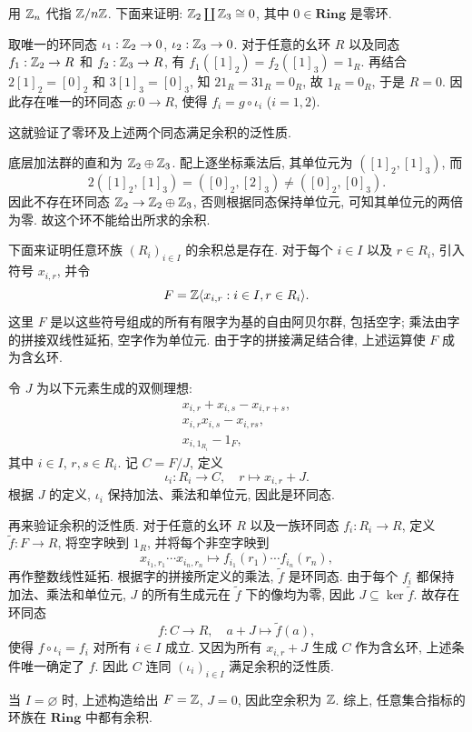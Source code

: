 \documentclass{article}
\begin{document}
\begin{solution}
	用 $\mathbb{Z}_n$ 代指 $\mathbb{Z} / n\mathbb{Z}$. 下面来证明: $\mathbb{Z}_2 \coprod \mathbb{Z}_3 \cong 0$, 其中 $0 \in \mathbf{Ring}$ 是零环. 

	取唯一的环同态 $\iota_1: \mathbb{Z}_2 \to 0$, $\iota_2: \mathbb{Z}_3 \to 0$. 对于任意的幺环 $R$ 以及同态 $f_1: \mathbb{Z}_2 \to R$ 和 $f_2: \mathbb{Z}_3 \to R$, 有 $f_1([1]_2) = f_2([1]_3) = 1_R$. 再结合 $2[1]_2 = [0]_2$ 和 $3[1]_3 = [0]_3$, 知 $2 1_R = 3 1_R = 0_R$, 故 $1_R = 0_R$, 于是 $R = 0$. 因此存在唯一的环同态 $g: 0 \to R$, 使得 $f_i = g \circ \iota_i$ ($i = 1, 2$). 

	这就验证了零环及上述两个同态满足余积的泛性质.

	底层加法群的直和为 $\mathbb{Z}_2 \oplus \mathbb{Z}_3$. 配上逐坐标乘法后, 其单位元为 $([1]_2, [1]_3)$, 而
	\[ 2([1]_2, [1]_3) = ([0]_2, [2]_3) \neq ([0]_2, [0]_3). \]
	因此不存在环同态 $\mathbb{Z}_2 \to \mathbb{Z}_2 \oplus \mathbb{Z}_3$, 否则根据同态保持单位元, 可知其单位元的两倍为零. 故这个环不能给出所求的余积.

	下面来证明任意环族 $(R_i)_{i \in I}$ 的余积总是存在. 对于每个 $i \in I$ 以及 $r \in R_i$, 引入符号 $x_{i,r}$, 并令
	\[ F = \mathbb{Z}\langle x_{i,r}: i \in I, r \in R_i \rangle. \]
	这里 $F$ 是以这些符号组成的所有有限字为基的自由阿贝尔群, 包括空字; 乘法由字的拼接双线性延拓, 空字作为单位元. 由于字的拼接满足结合律, 上述运算使 $F$ 成为含幺环.

	令 $J$ 为以下元素生成的双侧理想:
	\begin{gather*}
		x_{i,r} + x_{i,s} - x_{i,r+s},\\
		x_{i,r}x_{i,s} - x_{i,rs},\\
		x_{i,1_{R_i}} - 1_F,
	\end{gather*}
	其中 $i \in I$, $r, s \in R_i$. 记 $C = F/J$, 定义
	\[ \iota_i: R_i \to C, \quad r \mapsto x_{i,r} + J. \]
	根据 $J$ 的定义, $\iota_i$ 保持加法、乘法和单位元, 因此是环同态.

	再来验证余积的泛性质. 对于任意的幺环 $R$ 以及一族环同态 $f_i: R_i \to R$, 定义 $\widetilde{f}: F \to R$, 将空字映到 $1_R$, 并将每个非空字映到
	\[ x_{i_1,r_1} \cdots x_{i_n,r_n} \mapsto f_{i_1}(r_1) \cdots f_{i_n}(r_n), \]
	再作整数线性延拓. 根据字的拼接所定义的乘法, $\widetilde{f}$ 是环同态. 由于每个 $f_i$ 都保持加法、乘法和单位元, $J$ 的所有生成元在 $\widetilde{f}$ 下的像均为零, 因此 $J \subseteq \ker \widetilde{f}$. 故存在环同态
	\[ f: C \to R, \quad a + J \mapsto \widetilde{f}(a), \]
	使得 $f \circ \iota_i = f_i$ 对所有 $i \in I$ 成立. 又因为所有 $x_{i,r} + J$ 生成 $C$ 作为含幺环, 上述条件唯一确定了 $f$. 因此 $C$ 连同 $(\iota_i)_{i \in I}$ 满足余积的泛性质.

	当 $I = \varnothing$ 时, 上述构造给出 $F = \mathbb{Z}$, $J = 0$, 因此空余积为 $\mathbb{Z}$. 综上, 任意集合指标的环族在 $\mathbf{Ring}$ 中都有余积.
\end{solution}
\end{document}
